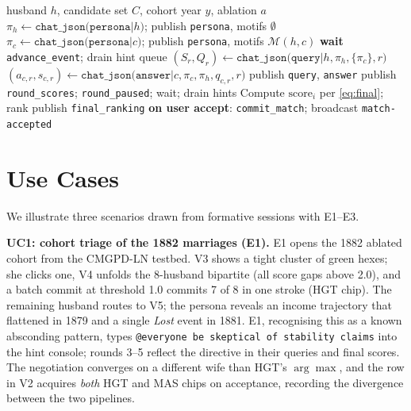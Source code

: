\documentclass[review]{vgtc}                  %
\begin{document}
\begin{algorithm}[t]
\caption{Six-round bilateral negotiation.}
\label{alg:rounds}
\small
\begin{algorithmic}[1]
\Require husband $h$, candidate set $C$, cohort year $y$, ablation $a$
\State $\pi_h \gets \texttt{chat\_json(persona|}h\texttt{)}$;
       publish \texttt{persona}, motifs $\emptyset$
  \State $\pi_c \gets \texttt{chat\_json(persona|}c\texttt{)}$;
         publish \texttt{persona}, motifs $\mathcal{M}(h, c)$
\EndFor
\State \textbf{wait} \texttt{advance\_event}; drain hint queue
  \State $(S_r, Q_r) \gets \texttt{chat\_json(query|}h, \pi_h,
     \{\pi_c\}, r\texttt{)}$
    \State $(a_{c,r}, s_{c,r}) \gets
       \texttt{chat\_json(answer|}c, \pi_c, \pi_h, q_{c,r}, r\texttt{)}$
    \State publish \texttt{query}, \texttt{answer}
  \EndFor
  \State publish \texttt{round\_scores}; \texttt{round\_paused};
         wait; drain hints
\EndFor
\State Compute $\mathrm{score}_i$ per \cref{eq:final}; rank
\State publish \texttt{final\_ranking}
\State \textbf{on user accept}: \texttt{commit\_match}; broadcast
       \texttt{match-accepted}
\end{algorithmic}
\end{algorithm}

\section{Use Cases}
\label{sec:cases}

We illustrate three scenarios drawn from formative sessions with
E1--E3.

\textbf{UC1: cohort triage of the 1882 marriages (E1).}
E1 opens the 1882 ablated cohort from the CMGPD-LN testbed. V3 shows
a tight cluster of green hexes; she clicks one, V4 unfolds the
8-husband bipartite (all score gaps above 2.0), and a batch commit
at threshold 1.0 commits 7 of 8 in one stroke (\textsf{HGT} chip).
The remaining husband routes to V5; the persona reveals an income
trajectory that flattened in 1879 and a single \emph{Lost} event in
1881. E1, recognising this as a known absconding pattern, types
\texttt{@everyone be skeptical of stability claims} into the hint
console; rounds 3--5 reflect the directive in their queries and
final scores. The negotiation converges on a different wife than
HGT's $\arg\max$, and the row in V2 acquires \emph{both}
\textsf{HGT} and \textsf{MAS} chips on acceptance, recording the
divergence between the two pipelines.
\end{document}
